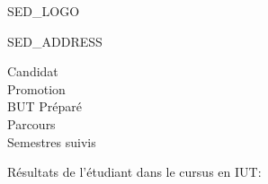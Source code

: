 \documentclass{article}
\begin{document}
\begin{minipage}[T]{0.51\textwidth}
    SED_LOGO
    \vfill
\end{minipage}%
\hfill
\vline
\hfill
\begin{minipage}[T]{0.45\textwidth}
    \raggedleft
    SED_ADDRESS
\end{minipage}

\vspace{1em}
\begin{center}
\end{center}
\vspace{0.5em}
\begin{center}
    \begin{description}
        \item[Candidat] \candidat
        \item[Promotion] \promotion
        \item[BUT Préparé] \but
        \item[Parcours] \parcours
        \item[Semestres suivis] \semestres
    \end{description}
\end{center}
\vspace{1em}
\noindent Résultats de l'étudiant dans le cursus en IUT:
\end{document}
